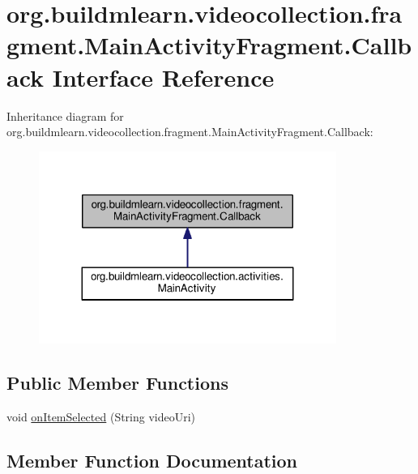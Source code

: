 \hypertarget{interfaceorg_1_1buildmlearn_1_1videocollection_1_1fragment_1_1MainActivityFragment_1_1Callback}{}\section{org.\+buildmlearn.\+videocollection.\+fragment.\+Main\+Activity\+Fragment.\+Callback Interface Reference}
\label{interfaceorg_1_1buildmlearn_1_1videocollection_1_1fragment_1_1MainActivityFragment_1_1Callback}


Inheritance diagram for org.\+buildmlearn.\+videocollection.\+fragment.\+Main\+Activity\+Fragment.\+Callback\+:
\nopagebreak
\begin{figure}[H]
\begin{center}
\leavevmode
\includegraphics[width=275pt]{interfaceorg_1_1buildmlearn_1_1videocollection_1_1fragment_1_1MainActivityFragment_1_1Callback__inherit__graph}
\end{center}
\end{figure}
\subsection*{Public Member Functions}
\begin{DoxyCompactItemize}
\item 
void \hyperlink{interfaceorg_1_1buildmlearn_1_1videocollection_1_1fragment_1_1MainActivityFragment_1_1Callback_a381ad85f545dd68dc93cfa01e704c25e}{on\+Item\+Selected} (String video\+Uri)
\end{DoxyCompactItemize}


\subsection{Member Function Documentation}
